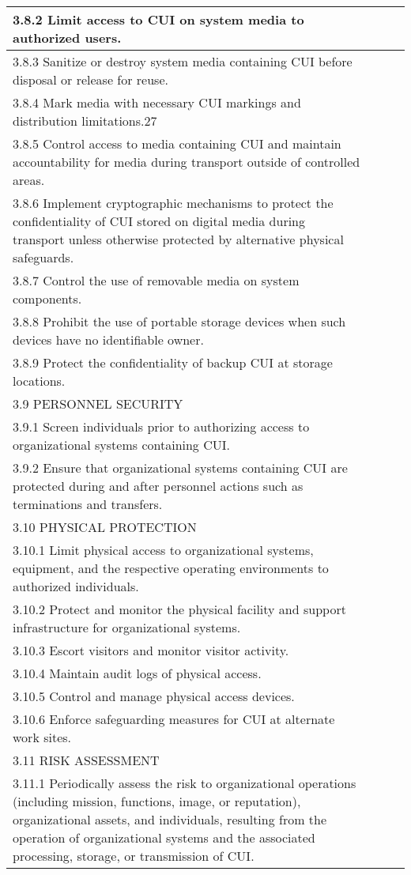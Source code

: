\begin{longtable} {|p{}|p{}|p{}|p{} |}
{3.8.2 Limit access to CUI on system media to authorized users.}&&& \\ \hline
{3.8.3 Sanitize or destroy system media containing CUI before disposal or release for reuse.}&&& \\ \hline
{3.8.4 Mark media with necessary CUI markings and distribution limitations.27}&&& \\ \hline
{3.8.5 Control access to media containing CUI and maintain accountability for media during transport outside of controlled areas.}&&& \\ \hline
{3.8.6 Implement cryptographic mechanisms to protect the confidentiality of CUI stored on digital media during transport unless otherwise protected by alternative physical safeguards.}&&& \\ \hline
{3.8.7 Control the use of removable media on system components.}&&& \\ \hline
{3.8.8 Prohibit the use of portable storage devices when such devices have no identifiable owner.}&&& \\ \hline
{3.8.9 Protect the confidentiality of backup CUI at storage locations.}&&& \\ \hline
{3.9 PERSONNEL SECURITY}&&& \\ \hline
{3.9.1 Screen individuals prior to authorizing access to organizational systems containing CUI.}&&& \\ \hline
{3.9.2 Ensure that organizational systems containing CUI are protected during and after personnel actions such as terminations and transfers.}&&& \\ \hline
{3.10 PHYSICAL PROTECTION}&&& \\ \hline
{3.10.1 Limit physical access to organizational systems, equipment, and the respective operating environments to authorized individuals.}&&& \\ \hline
{3.10.2 Protect and monitor the physical facility and support infrastructure for organizational systems.}&&& \\ \hline
{3.10.3 Escort visitors and monitor visitor activity.}&&& \\ \hline
{3.10.4 Maintain audit logs of physical access.}&&& \\ \hline
{3.10.5 Control and manage physical access devices.}&&& \\ \hline
{3.10.6 Enforce safeguarding measures for CUI at alternate work sites.}&&& \\ \hline
{3.11 RISK ASSESSMENT}&&& \\ \hline
{3.11.1 Periodically assess the risk to organizational operations (including mission, functions, image, or reputation), organizational assets, and individuals, resulting from the operation of organizational systems and the associated processing, storage, or transmission of CUI.}&&& \\ \hline

\end{longtable}
